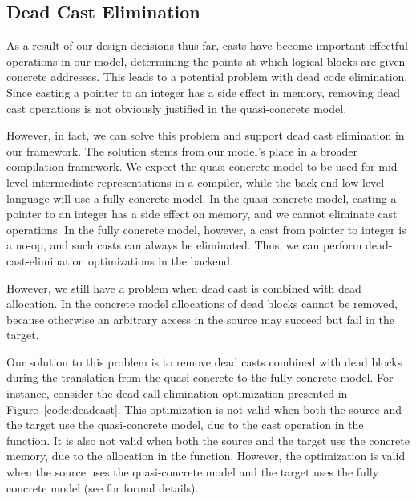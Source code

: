 \subsection{Dead Cast Elimination}
\label{idea:deadcast}

As a result of our design decisions thus far, casts have become
important effectful operations in our model, determining the points at
which logical blocks are given concrete addresses. This leads to a
potential problem with dead code elimination.  Since casting a pointer
to an integer has a side effect in memory, removing dead cast
operations is not obviously justified in the quasi-concrete model.

However, in fact,
we can solve this problem and support dead cast elimination in our
framework. 
The solution stems from our model's place in a broader compilation
framework. We expect the quasi-concrete model to be used for mid-level
intermediate representations in a compiler, while the back-end
low-level language will use a fully concrete model. In the
quasi-concrete model, casting a pointer to an integer has a side
effect on memory, and we cannot eliminate cast operations. In the
fully concrete model, however, a cast from pointer to integer is a 
no-op, and such casts can always be eliminated. Thus, we can
perform dead-cast-elimination optimizations in the backend.

However, we still have a problem when dead cast is combined with dead
allocation. In the concrete model allocations of dead blocks cannot be
removed, because otherwise an arbitrary access in the source may
succeed but fail in the target. 

Our solution to this problem is to remove dead casts combined with dead blocks during
the translation from the quasi-concrete to the fully concrete model.
For instance, consider the dead call elimination optimization presented in Figure~\ref{code:deadcast}. This optimization is not valid when both the source and
the target use the quasi-concrete model, due to the cast operation in the
function. It is also not valid when both the source and the target use
the concrete memory, due to the allocation in the function. However, the optimization is valid when the source uses the
quasi-concrete model and the target uses the fully concrete model (see  for formal details).

